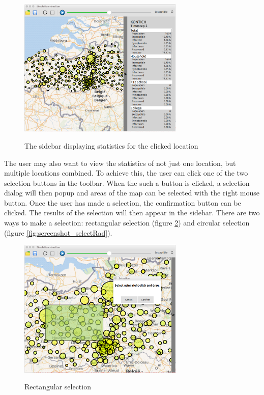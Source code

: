 \begin{figure}[H]
\centering
\includegraphics[width=0.7\textwidth,keepaspectratio]{images/stats_loc.png}
\label{fig:sceenshot_statsLoc}
\caption{The sidebar displaying statistics for the clicked location}
\end{figure}

The user may also want to view the statistics of not just one location, but multiple locations combined. To achieve this, the user can click one of the two selection buttons in the toolbar. When the such a button is clicked, a selection dialog will then popup and areas of the map can be selected with the right mouse button. Once the user has made a selection, the confirmation button can be clicked. The results of the selection will then appear in the sidebar. There are two ways to make a selection: rectangular selection (figure \ref{fig:screenshot_selectRect}) and circular selection (figure \ref{fig:screenshot_selectRad}).

\begin{figure}[H]
\centering
\includegraphics[width=0.7\textwidth,keepaspectratio]{images/select_rect.png}
\label{fig:screenshot_selectRect}
\caption{Rectangular selection}
\end{figure}

